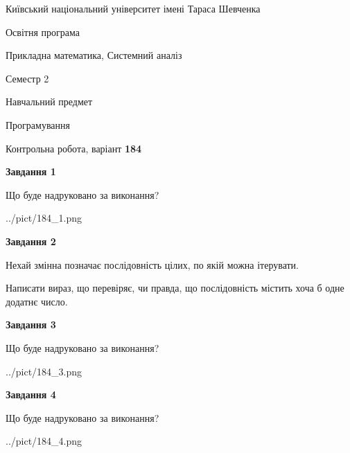\documentclass[12pt, ukrainian]{article}
\begin{document}
{{\begin {small}\par
{ \center  Київський національний університет імені Тараса Шевченка \par}
{\parbox {5 cm}{Освітня програма \hfill}{\parbox {8 cm}{Прикладна математика, Системний аналіз \hfill}}\parbox {5 cm}{\hfill Семестр 2}}\par
{\parbox {5 cm} {Навчальний предмет \hfill}\parbox {7 cm}{Програмування \hfill}\parbox {6cm}{\hfill}\par}\vspace{-7pt} \end{small}}{\center Контрольна робота, варіант  \No \textbf
{ 184 }\par}}
{
\begin {large}
{\begin {center}\textbf{Завдання 1}\end {center}}\par
Що буде надруковано за виконання?\par\par
\begin{center}
	{../pict/184_1.png}
\end{center}
\newpage

{\begin {center}\textbf{Завдання 2}\end {center}}\par
Нехай змінна  позначає послідовність цілих, по якій можна ітерувати.

Написати вираз, що перевіряє, чи правда, що послідовність  містить хоча б одне додатнє число.\par
\newpage

{\begin {center}\textbf{Завдання 3}\end {center}}\par
Що буде надруковано за виконання?
\begin{center}
	{../pict/184_3.png}
\end{center}
\newpage

{\begin {center}\textbf{Завдання 4}\end {center}}\par
Що буде надруковано за виконання?\par
\begin{center}
	{../pict/184_4.png}
\end{center}
\newpage


\end{large}}
\end{document}
